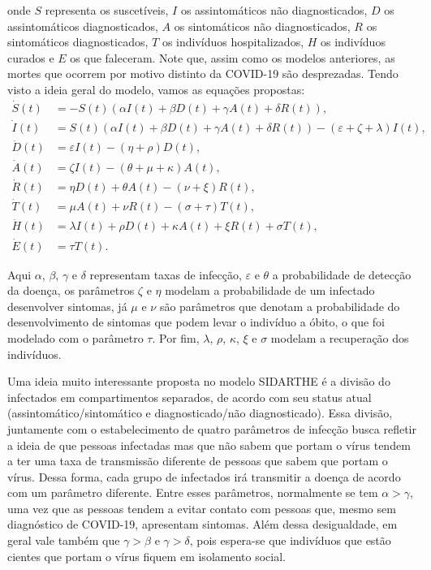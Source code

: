 \documentclass{article}
\begin{document}
\noindent onde $S$ representa os suscetíveis, $I$ os assintomáticos não diagnosticados, $D$ os assintomáticos diagnosticados, $A$ os sintomáticos não diagnosticados, $R$ os sintomáticos diagnosticados, $T$ os indivíduos hospitalizados, $H$ os indivíduos curados e $E$ os que faleceram. Note que, assim como os modelos anteriores, as mortes que ocorrem por motivo distinto da COVID-19 são desprezadas. Tendo visto a ideia geral do modelo, vamos as equações propostas:
\begin{equation*}
    \begin{split}
        \dot{S}(t) & = -S(t)(\alpha I(t) + \beta D(t) + \gamma A(t) + \delta R(t)),\\
        \dot{I}(t) & = S(t)(\alpha I(t) + \beta D(t) + \gamma A(t) + \delta R(t)) - (\varepsilon + \zeta + \lambda)I(t), \\
        \dot{D}(t) & = \varepsilon I(t) - (\eta + \rho)D(t), \\
        \dot{A}(t) & = \zeta I(t) - (\theta + \mu + \kappa)A(t), \\
        \dot{R}(t) & = \eta D(t) + \theta A(t) - (\nu + \xi)R(t), \\
        \dot{T}(t) & = \mu A(t) + \nu R(t) - (\sigma + \tau)T(t), \\
        \dot{H}(t) & = \lambda I(t) + \rho D(t) + \kappa A(t) + \xi R(t) + \sigma T(t), \\
        \dot{E}(t) & = \tau T(t).
    \end{split}
\end{equation*}

Aqui $\alpha$, $\beta$, $\gamma$ e $\delta$ representam taxas de infecção, $\varepsilon$ e $\theta$ a probabilidade de detecção da doença, os parâmetros $\zeta$ e $\eta$ modelam a probabilidade de um infectado desenvolver sintomas, já $\mu$ e $\nu$ são parâmetros que denotam a probabilidade do desenvolvimento de sintomas que podem levar o indivíduo a óbito, o que foi modelado com o parâmetro $\tau$. Por fim, $\lambda$, $\rho$, $\kappa$, $\xi$ e $\sigma$ modelam a recuperação dos indivíduos.

Uma ideia muito interessante proposta no modelo SIDARTHE é a divisão do infectados em compartimentos separados, de acordo com seu status atual (assintomático/sintomático e diagnosticado/não diagnosticado). Essa divisão, juntamente com o estabelecimento de quatro parâmetros de infecção busca refletir a ideia de que pessoas infectadas mas que não sabem que portam o vírus tendem a ter uma taxa de transmissão diferente de pessoas que sabem que portam o vírus. Dessa forma, cada grupo de infectados irá transmitir a doença de acordo com um parâmetro diferente. Entre esses parâmetros, normalmente se tem $\alpha > \gamma$, uma vez que as pessoas tendem a evitar contato com pessoas que, mesmo sem diagnóstico de COVID-19, apresentam sintomas. Além dessa desigualdade, em geral vale também que $\gamma > \beta$ e $\gamma > \delta$, pois espera-se que indivíduos que estão cientes que portam o vírus fiquem em isolamento social.
\end{document}
